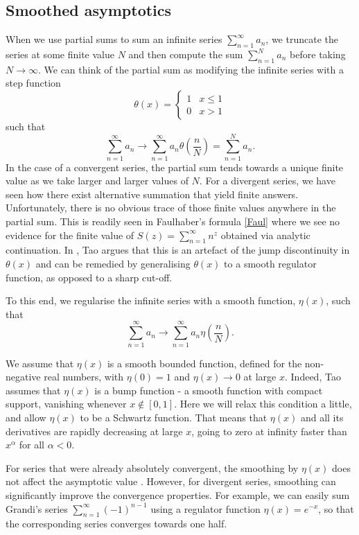 \documentclass[11pt, letter]{article}
\def\be{\begin{equation}}
\def\ee{\end{equation}}
\begin{document}
\subsection{Smoothed asymptotics}\label{SectTaosmoothasymptotics}
When we use partial sums to sum an infinite series $\sum_{n=1}^\infty a_n$, we truncate the series at some finite value $N$ and then compute the sum $\sum_{n=1}^N a_n$ before taking $N \to \infty$. We can think of the partial sum as modifying the infinite series with a step function  
\be
\theta(x)=\begin{cases} 
1 & x \leq 1  \\
0  &x>1
\end{cases}
\ee
such that
\be
\sum_{n=1}^\infty a_n \to \sum_{n=1}^\infty a_n \theta\left(\frac{n}{N}\right)=\sum_{n=1}^N a_n.
\ee
In the case of a convergent series, the partial sum  tends towards a unique finite value  as we take larger and larger values of $N$.  For a divergent series, we have seen how there exist alternative summation that yield finite answers. Unfortunately, there is no obvious trace of those finite values anywhere in the partial sum.  This is readily seen in Faulhaber's formula \eqref{Faul} where we see no evidence for the finite value of $S(z)=\sum_{n=1}^\infty n^z$ obtained via analytic continuation. In \cite{Tao11}, Tao argues that this is an artefact of the jump discontinuity in $\theta(x)$ and can be remedied by generalising $\theta(x)$ to a smooth regulator function, as opposed to a sharp cut-off. 

To this end, we regularise the infinite series with a smooth function, $\eta(x)$, such that
\be
\sum_{n=1}^\infty a_n \to \sum_{n=1}^\infty a_n \eta\left(\frac{n}{N}\right). 
\ee
%


We assume that  $\eta(x)$ is  a smooth bounded function, defined for the non-negative real numbers, with $\eta(0) = 1$ and $\eta(x) \to 0$ at large $x$.  Indeed, Tao assumes that $\eta(x)$ is a bump function - a smooth function with compact support, vanishing whenever $x \notin [0,1]$.  Here we will relax this condition a little, and allow $\eta(x)$ to be a Schwartz function. That means that $\eta(x)$ and all its derivatives are rapidly decreasing at large $x$,  going to zero at infinity faster than $x^{\alpha}$ for all $\alpha < 0$.



For series that were already absolutely convergent, the smoothing by $\eta(x)$  does not affect the asymptotic value \cite{Tao11}. However, for divergent series, smoothing can significantly improve the convergence properties.  For example, we can  easily sum Grandi's series $\sum_{n=1}^\infty (-1)^{n-1}$ using a regulator function $\eta(x)=e^{-x}$, so that the corresponding series converges towards one half. 
\end{document}
